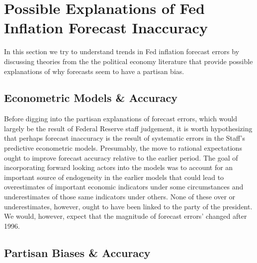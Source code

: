 \documentclass[a4paper]{article}\usepackage{graphicx, color}
\begin{document}
\section{Possible Explanations of Fed Inflation Forecast Inaccuracy}

In this section we try to understand trends in Fed inflation forecast errors by discussing theories from the the political economy literature that provide possible explanations of why forecasts seem to have a partisan bias. 

\subsection{Econometric Models \& Accuracy}

Before digging into the partisan explanations of forecast errors, which would largely be the result of Federal Reserve staff judgement, it is worth hypothesizing that perhaps forecast inaccuracy is the result of systematic errors in the Staff's predictive econometric models. Presumably, the move to rational expectations ought to improve forecast accuracy relative to the earlier period. The goal of incorporating forward looking actors into the models was to account for an important source of endogeneity in the earlier models that could lead to overestimates of important economic indicators under some circumstances and underestimates of those same indicators under others. None of these over or underestimates, however, ought to have been linked to the party of the president. We would, however, expect that the magnitude of forecast errors' changed after 1996.



\subsection{Partisan Biases \& Accuracy}
\end{document}
